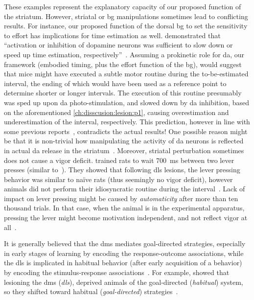 These examples represent the explanatory capacity of our proposed function of the striatum.
However, striatal or \gls{bg} manipulations sometimes lead to conflicting results.
For instance, our proposed function of the dorsal \gls{bg} to set the sensitivity to effort has implications for time estimation as well.
 demonstrated that ``activation or inhibition of dopamine neurons was sufficient to slow down or speed up time estimation, respectively''~\cite{Paton2016Sci}.
Assuming a prokinetic role for \gls{da}, our framework (embodied timing, plus the effort function of the \gls{bg}), would suggest that mice might have executed a subtle motor routine during the to-be-estimated interval, the ending of which would have been used as a reference point to determine shorter or longer intervals.
The execution of this routine presumably was sped up upon \gls{da} photo-stimulation, and slowed down by \gls{da} inhibition, based on the aforementioned \autoref{ch:disscusion:lesion:p1}, causing overestimation and underestimation of the interval, respectively.
This prediction, however in line with some previous reports~\cite[see][for a review]{Buhusi2005NatRevNeuro}, contradicts the actual results!
One possible reason might be that it is non-trivial how manipulating the activity of \gls{da} neurons is reflected in actual \gls{da} release in the striatum~\cite[for instance, see][]{Mohebi2019N}.
Moreover, striatal perturbation sometimes does not cause a vigor deficit.
 trained rats to wait 700~ms between two lever presses (similar to~\cite{Kawai2015}).
They showed that following \gls{dls} lesions, the lever pressing behavior was similar to na\"{i}ve rats (thus seemingly no vigor deficit), however animals did not perform their idiosyncratic routine during the interval~\cite{Dhawale2019}.
Lack of impact on lever pressing might be caused by \emph{automaticity}\! after more than ten thousand trials.
In that case, when the animal is in the experimental apparatus, pressing the lever might become motivation independent, and not reflect vigor at all~\cite{Dudman2016CurrOpinNeurobiol}.
\par
It is generally believed that the \gls{dms} mediates goal-directed strategies, especially in early stages of learning by encoding the response-outcome associations, while the \gls{dls} is implicated in habitual behavior (after early acquisition of a behavior) by encoding the stimulus-response associations~\cite{Yin2006NatRevNeurosci}.
For example,  showed that lesioning the \gls{dms} (\textit{\gls{dls}}), deprived animals of the goal-directed (\textit{habitual}) system, so they shifted toward habitual (\textit{goal-directed}) strategies~\cite{Gremel2013}.
